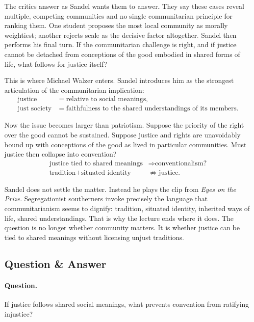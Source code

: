 The critics answer as Sandel wants them to answer. They say these cases reveal multiple, competing communities and no single communitarian principle for ranking them. One student proposes the most local community as morally weightiest; another rejects scale as the decisive factor altogether. Sandel then performs his final turn. If the communitarian challenge is right, and if justice cannot be detached from conceptions of the good embodied in shared forms of life, what follows for justice itself?

This is where Michael Walzer enters. Sandel introduces him as the strongest articulation of the communitarian implication:
\begin{align}
\text{justice} &= \text{relative to social meanings}, \\
\text{just society} &= \text{faithfulness to the shared understandings of its members}.
\end{align}

Now the issue becomes larger than patriotism. Suppose the priority of the right over the good cannot be sustained. Suppose justice and rights are unavoidably bound up with conceptions of the good as lived in particular communities. Must justice then collapse into convention?
\begin{align}
\text{justice tied to shared meanings} &\Longrightarrow \text{conventionalism?} \\
\text{tradition} + \text{situated identity} &\not\Longrightarrow \text{justice}.
\end{align}

Sandel does not settle the matter. Instead he plays the clip from \emph{Eyes on the Prize}. Segregationist southerners invoke precisely the language that communitarianism seems to dignify: tradition, situated identity, inherited ways of life, shared understandings. That is why the lecture ends where it does. The question is no longer whether community matters. It is whether justice can be tied to shared meanings without licensing unjust traditions.

\subsection{Question \& Answer}

\paragraph{Question.} If justice follows shared social meanings, what prevents convention from ratifying injustice?

